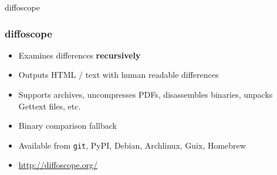 \documentclass[14pt,aspectratio=169]{beamer}
\begin{document}
{
\begin{frame}{diffoscope}
 \frametitle{diffoscope}
 \begin{itemize}
  \item Examines differences \textbf{recursively}
  \item Outputs HTML / text with human readable differences
  \item Supports archives, uncompresses PDFs, disassembles binaries, unpacks Gettext files, etc.
  \item Binary comparison fallback
  \item Available from \texttt{git}, PyPI, Debian, Archlinux, Guix, Homebrew
  \item \url{http://diffoscope.org/}
 \end{itemize}
\end{frame}
}

\begin{frame}
\end{frame}
\end{document}
